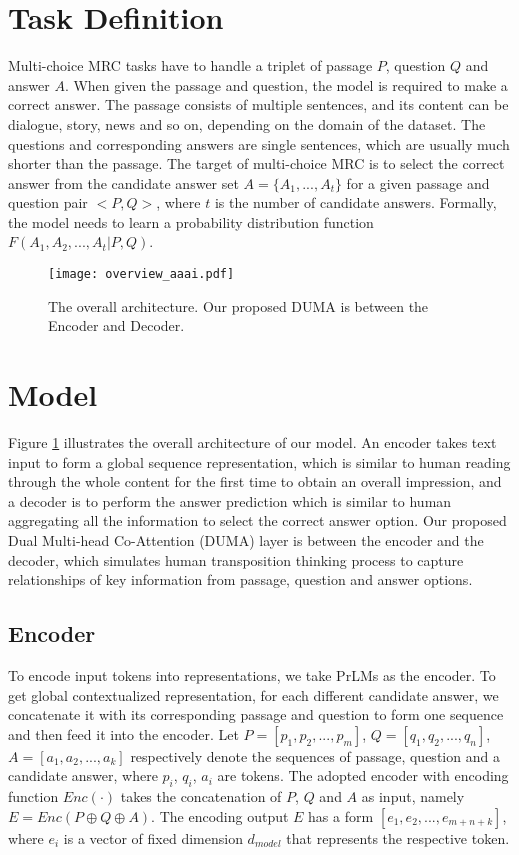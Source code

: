 \documentclass[letterpaper]{article} \usepackage{aaai21}  \usepackage{times}  \usepackage{helvet} \usepackage{courier}  \usepackage[hyphens]{url}  \usepackage{graphicx} \urlstyle{rm} \def\UrlFont{\rm}  \usepackage{natbib}  \usepackage{caption} \frenchspacing  \setlength{\pdfpagewidth}{8.5in}  \setlength{\pdfpageheight}{11in}
\begin{document}
\section{Task Definition}
Multi-choice MRC tasks have to handle a triplet of passage $P$, question $Q$ and answer $A$. When given the passage and question, the model is required to make a correct answer. The passage consists of multiple sentences, and its content can be dialogue, story, news and so on, depending on the domain of the dataset. The questions and corresponding answers are single sentences, which are usually much shorter than the passage. The target of multi-choice MRC is to select the correct answer from the candidate answer set $ A = \{A_{1}, ... , A_{t}\} $ for a given passage and question pair $<P,Q>$, where $t$ is the number of candidate answers. Formally, the model needs to learn a probability distribution function $F(A_1,A_2,...,A_t|P,Q)$.

\begin{figure}[!htb]
	\centering
	\texttt{[image: overview\_aaai.pdf]}
	\caption{The overall architecture. Our proposed DUMA is between the Encoder and Decoder.}
	\label{fig:overview}
\end{figure}

\section{Model}
\label{sec_model}

Figure \ref{fig:overview} illustrates the overall architecture of our model. An encoder takes text input to form a global sequence representation, which is similar to human reading through the whole content for the first time to obtain an overall impression, and a decoder is to perform the answer prediction which is similar to human aggregating all the information to select the correct answer option. Our proposed Dual Multi-head Co-Attention (DUMA) layer is between the encoder and the decoder, which simulates human transposition thinking process to capture relationships of key information from passage, question and answer options.

\subsection{Encoder}
To encode input tokens into representations, we take PrLMs as the encoder. To get global contextualized representation, for each different candidate answer, we concatenate it with its corresponding passage and question to form one sequence and then feed it into the encoder. Let $ P = [p_{1}, p_{2}, ... , p_{m}] $, $ Q = [q_{1}, q_{2}, ... , q_{n}] $, $ A = [a_{1}, a_{2}, ... , a_{k}] $ respectively denote the sequences of passage, question and a candidate answer, where $p_{i}$, $q_{i}$, $a_{i}$ are tokens. The adopted encoder with encoding function $Enc(\cdot)$ takes the concatenation of $P$, $Q$ and $A$ as input, namely $E=Enc(P\oplus Q\oplus A)$. The encoding output $E$ has a form $ [e_1, e_2, ..., e_{m+n+k}]$, where $e_i$ is a vector of fixed dimension $d_{model}$ that represents the respective token.
\end{document}
